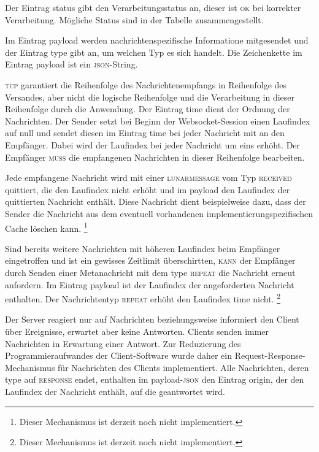 \documentclass[english,11pt]{report}
\begin{document}
Der Eintrag status gibt den Verarbeitungsstatus an, dieser ist \textsc{ok} bei korrekter
Verarbeitung. Mögliche Status sind in der Tabelle zusammengestellt.

Im Eintrag payload werden nachrichtenspezifische Informatione mitgesendet und der Eintrag
type gibt an, um welchen Typ es sich handelt. Die Zeichenkette im Eintrag payload ist ein
\textsc{json}-String.

\textsc{tcp} garantiert die Reihenfolge des Nachrichtenempfangs in Reihenfolge des Versandes,
aber nicht die logische Reihenfolge und die Verarbeitung in dieser Reihenfolge durch die
Anwendung. Der Eintrag time dient der Ordnung der Nachrichten. Der Sender setzt bei Beginn
der Websocket-Session einen Laufindex auf null und sendet diesen im Eintrag time bei jeder
Nachricht mit an den Empfänger. Dabei wird der Laufindex bei jeder Nachricht um eins erhöht.
Der Empfänger \textsc{muss} die empfangenen Nachrichten in dieser Reihenfolge bearbeiten.

Jede empfangene Nachricht wird mit einer \textsc{lunarmessage} vom Typ \textsc{received} quittiert,
die den Laufindex nicht erhöht und im payload den Laufindex der quittierten Nachricht enthält.
Diese Nachricht dient beispielweise dazu, dass der Sender die Nachricht aus dem eventuell vorhandenen
implementierungspezifischen Cache löschen kann.
\footnote{Dieser Mechanismus ist derzeit noch nicht implementiert.}

Sind bereits weitere Nachrichten mit höheren Laufindex beim Empfänger eingetroffen und ist ein gewisses
Zeitlimit überschirtten, \textsc{kann} der Empfänger durch Senden einer Metanachricht mit dem
type \textsc{repeat} die Nachricht erneut anfordern. Im Eintrag payload ist der Laufindex der
angeforderten Nachricht enthalten. Der Nachrichtentyp \textsc{repeat} erhöht den Laufindex time nicht.
\footnote{Dieser Mechanismus ist derzeit noch nicht implementiert.}

Der Server reagiert nur auf Nachrichten beziehungsweise informiert den Client über Ereignisse,
erwartet aber keine Antworten. Clients senden immer Nachrichten in Erwartung einer Antwort.
Zur Reduzierung des Programmieraufwandes der Client-Software wurde daher ein
Request-Response-Mechanismus für Nachrichten des Clients implementiert. Alle Nachrichten, deren
type auf \textsc{response} endet, enthalten im payload-\textsc{json} den Eintrag origin, der
den Laufindex der Nachricht enthält, auf die geantwortet wird.
\end{document}
